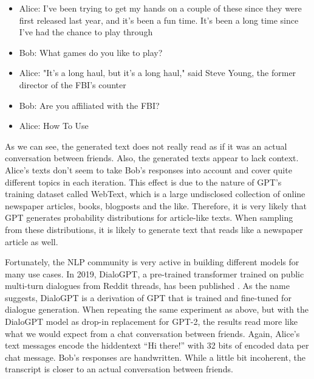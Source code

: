 \begin{example}
\leavevmode
\begin{itemize}
\item Alice: I've been trying to get my hands on a couple of these since they were first released last year, and it's been a fun time. It's been a long time since I've had the chance to play through
\item Bob: What games do you like to play?
\item Alice: "It's a long haul, but it's a long haul," said Steve Young, the former director of the FBI's counter
\item Bob: Are you affiliated with the FBI?
\item Alice: How To Use
\end{itemize}
\end{example}

As we can see, the generated text does not really read as if it was an actual conversation between friends.
Also, the generated texts appear to lack context.
Alice's texts don't seem to take Bob's responses into account and cover quite different topics in each iteration.
This effect is due to the nature of GPT's training dataset called WebText, which is a large undisclosed collection of online newspaper articles, books, blogposts and the like.
Therefore, it is very likely that GPT generates probability distributions for article-like texts.
When sampling from these distributions, it is likely to generate text that reads like a newspaper article as well.

Fortunately, the NLP community is very active in building different models for many use cases.
In 2019, DialoGPT, a pre-trained transformer trained on public multi-turn dialogues from Reddit threads, has been published \cite{Zhang2020}.
As the name suggests, DialoGPT is a derivation of GPT that is trained and fine-tuned for dialogue generation.
When repeating the same experiment as above, but with the DialoGPT model as drop-in replacement for GPT-2, the results read more like what we would expect from a chat conversation between friends.
Again, Alice's text messages encode the hiddentext ``Hi there!'' with 32 bits of encoded data per chat message.
Bob's responses are handwritten.
While a little bit incoherent, the transcript is closer to an actual conversation between friends.


